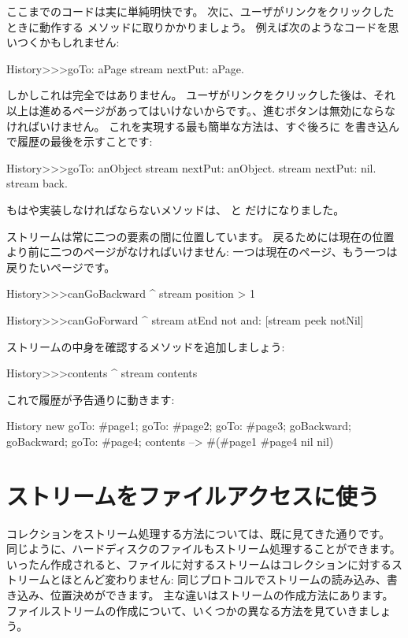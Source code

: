 \documentclass[a4paper,10pt,twoside]{book}
\begin{document}
ここまでのコードは実に単純明快です。
次に、ユーザがリンクをクリックしたときに動作する  メソッドに取りかかりましょう。
例えば次のようなコードを思いつくかもしれません:

\begin{code}{}
History>>>goTo: aPage
    stream nextPut: aPage.
\end{code}

しかしこれは完全ではありません。
ユーザがリンクをクリックした後は、それ以上は進めるページがあってはいけないからです。\ie、進むボタンは無効にならなければいけません。
これを実現する最も簡単な方法は、すぐ後ろに  を書き込んで履歴の最後を示すことです:

\begin{code}{}
History>>>goTo: anObject
  stream nextPut: anObject.
  stream nextPut: nil.
  stream back.
\end{code}

もはや実装しなければならないメソッドは、 と  だけになりました。

ストリームは常に二つの要素の間に位置しています。
戻るためには現在の位置より前に二つのページがなければいけません:
一つは現在のページ、もう一つは戻りたいページです。

\begin{code}{}
History>>>canGoBackward
  ^ stream position > 1

History>>>canGoForward
  ^ stream atEnd not and: [stream peek notNil]
\end{code}

ストリームの中身を確認するメソッドを追加しましょう:
\begin{code}{}
History>>>contents
  ^ stream contents
\end{code}

これで履歴が予告通りに動きます:
\begin{code}{}
History new
	goTo: #page1;
	goTo: #page2;
	goTo: #page3;
	goBackward;
	goBackward;
	goTo: #page4;
	contents --> #(#page1 #page4 nil nil)
\end{code}

\section{ストリームをファイルアクセスに使う}

コレクションをストリーム処理する方法については、既に見てきた通りです。
同じように、ハードディスクのファイルもストリーム処理することができます。
いったん作成されると、ファイルに対するストリームはコレクションに対するストリームとほとんど変わりません:
同じプロトコルでストリームの読み込み、書き込み、位置決めができます。
主な違いはストリームの作成方法にあります。
ファイルストリームの作成について、いくつかの異なる方法を見ていきましょう。
\end{document}
